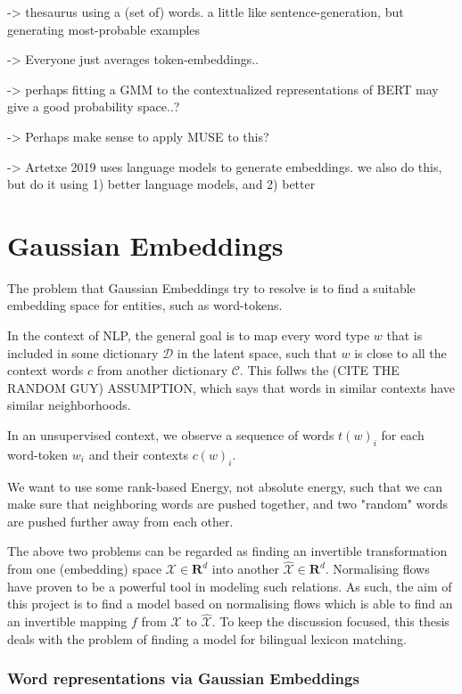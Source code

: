 \documentclass[a4paper,12pt,twoside,openright]{report}
\begin{document}
-> thesaurus using a (set of) words. a little like sentence-generation, but generating most-probable examples

-> Everyone just averages token-embeddings..

-> perhaps fitting a GMM to the contextualized representations of BERT may give a good probability space..?

-> Perhaps make sense to apply MUSE to this?

-> Artetxe 2019 uses language models to generate embeddings. we also do this, but do it using 1) better language models, and 2) better 

\section{Gaussian Embeddings}

The problem that Gaussian Embeddings try to resolve is to find a suitable embedding space for entities, such as word-tokens.

In the context of NLP, the general goal is to map every word type $w$ that is included in some dictionary $\mathcal{D}$ in the latent space, such that $w$ is close to all the context words $c$ from another dictionary $\mathcal{C}$.
This follws the (CITE THE RANDOM GUY) ASSUMPTION, which says that words in similar contexts have similar neighborhoods.

In an unsupervised context, we observe a sequence of words ${t(w)_i}$ for each word-token $w_i$ and their contexts $c(w)_i$.

We want to use some rank-based Energy, not absolute energy, such that we can make sure that neighboring words are pushed together, and two "random" words are pushed further away from each other.

The above two problems can be regarded as finding an invertible transformation from one (embedding) space $\mathcal{X} \in \mathbf{R}^d$ into another $\mathcal{\hat{X}} \in \mathbf{R}^d$. 
Normalising flows \cite{variational_inference_using_normalized_flows} \cite{nvp} have proven to be a powerful tool in modeling such relations.
As such, the aim of this project is to find a model based on normalising flows which is able to find an an invertible mapping $f$ from $\mathcal{X}$ to $\mathcal{\hat{X}}$.
To keep the discussion focused, this thesis deals with the problem of finding a model for bilingual lexicon matching.

\subsubsection{Word representations via Gaussian Embeddings}
\end{document}
